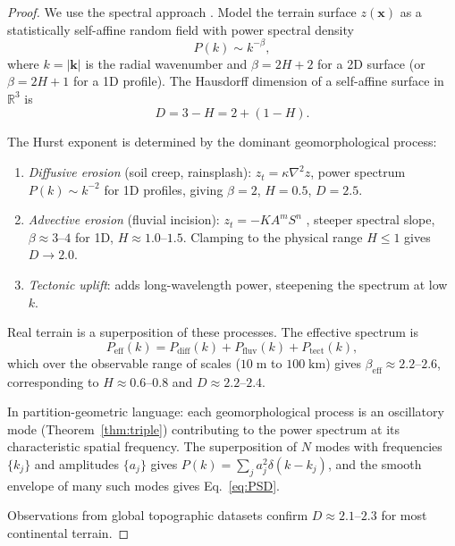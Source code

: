 \documentclass[10pt,twocolumn]{article}
\theoremstyle{definition}
\theoremstyle{remark}
\newcommand{\R}{\mathbb{R}}
\begin{document}
\begin{proof}
We use the spectral approach \citep{Mandelbrot1982,Turcotte1997}.
Model the terrain surface $z(\mathbf{x})$ as a statistically
self-affine random field with power spectral density
\begin{equation}\label{eq:PSD}
  P(k) \sim k^{-\beta},
\end{equation}
where $k=|\mathbf{k}|$ is the radial wavenumber and
$\beta=2H+2$ for a 2D surface (or $\beta = 2H+1$ for a 1D
profile).  The Hausdorff dimension of a self-affine surface in
$\R^3$ is \citep{Mandelbrot1982}
\begin{equation}
  D = 3 - H = 2 + (1-H).
\end{equation}

The Hurst exponent is determined by the dominant
geomorphological process:
\begin{enumerate}[leftmargin=*,itemsep=2pt]
\item \emph{Diffusive erosion} (soil creep, rainsplash):
  $z_t = \kappa\nabla^2 z$, power spectrum $P(k)\sim k^{-2}$
  for 1D profiles, giving $\beta=2$, $H=0.5$, $D=2.5$.
\item \emph{Advective erosion} (fluvial incision): $z_t =
  -K A^m S^n$ \citep{Whipple2004}, steeper spectral slope,
  $\beta\approx 3$--$4$ for 1D, $H\approx 1.0$--$1.5$.
  Clamping to the physical range $H\le 1$ gives $D\to 2.0$.
\item \emph{Tectonic uplift}: adds long-wavelength power,
  steepening the spectrum at low $k$.
\end{enumerate}

Real terrain is a superposition of these processes.  The
effective spectrum is
\begin{equation}
  P_{\mathrm{eff}}(k) = P_{\mathrm{diff}}(k)
  + P_{\mathrm{fluv}}(k) + P_{\mathrm{tect}}(k),
\end{equation}
which over the observable range of scales ($10\;\mathrm{m}$ to
$100\;\mathrm{km}$) gives $\beta_{\mathrm{eff}}\approx
2.2$--$2.6$, corresponding to $H\approx 0.6$--$0.8$ and
$D\approx 2.2$--$2.4$.

In partition-geometric language: each geomorphological process
is an oscillatory mode (Theorem~\ref{thm:triple}) contributing
to the power spectrum at its characteristic spatial frequency.
The superposition of $N$ modes with frequencies $\{k_j\}$ and
amplitudes $\{a_j\}$ gives
$P(k)=\sum_j a_j^2\delta(k-k_j)$, and the smooth envelope
of many such modes gives Eq.~\eqref{eq:PSD}.

Observations from global topographic datasets
\citep{Turcotte1997} confirm $D\approx 2.1$--$2.3$ for most
continental terrain.
\end{proof}
\end{document}
